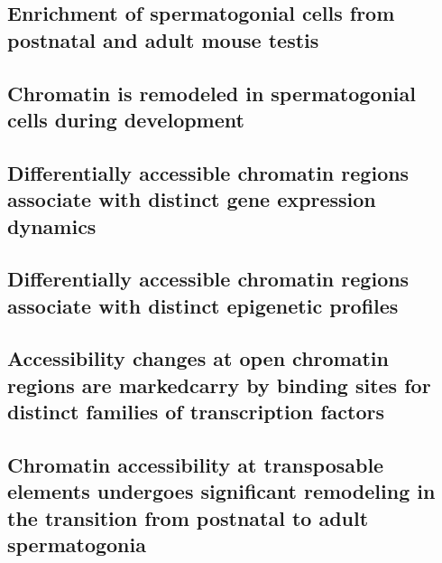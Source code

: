 \documentclass[12pt,twoside]{reedthesis}
\begin{document}
\hypertarget{enrichment-of-spermatogonial-cells-from-postnatal-and-adult-mouse-testis}{%
\subsection{Enrichment of spermatogonial cells from postnatal and adult mouse testis}\label{enrichment-of-spermatogonial-cells-from-postnatal-and-adult-mouse-testis}}

\hypertarget{chromatin-is-remodeled-in-spermatogonial-cells-during-development}{%
\subsection{Chromatin is remodeled in spermatogonial cells during development}\label{chromatin-is-remodeled-in-spermatogonial-cells-during-development}}

\hypertarget{differentially-accessible-chromatin-regions-associate-with-distinct-gene-expression-dynamics}{%
\subsection{Differentially accessible chromatin regions associate with distinct gene expression dynamics}\label{differentially-accessible-chromatin-regions-associate-with-distinct-gene-expression-dynamics}}

\hypertarget{differentially-accessible-chromatin-regions-associate-with-distinct-epigenetic-profiles}{%
\subsection{Differentially accessible chromatin regions associate with distinct epigenetic profiles}\label{differentially-accessible-chromatin-regions-associate-with-distinct-epigenetic-profiles}}

\hypertarget{accessibility-changes-at-open-chromatin-regions-are-markedcarry-by-binding-sites-for-distinct-families-of-transcription-factors}{%
\subsection{Accessibility changes at open chromatin regions are markedcarry by binding sites for distinct families of transcription factors}\label{accessibility-changes-at-open-chromatin-regions-are-markedcarry-by-binding-sites-for-distinct-families-of-transcription-factors}}

\hypertarget{chromatin-accessibility-at-transposable-elements-undergoes-significant-remodeling-in-the-transition-from-postnatal-to-adult-spermatogonia}{%
\subsection{Chromatin accessibility at transposable elements undergoes significant remodeling in the transition from postnatal to adult spermatogonia}\label{chromatin-accessibility-at-transposable-elements-undergoes-significant-remodeling-in-the-transition-from-postnatal-to-adult-spermatogonia}}
\end{document}
